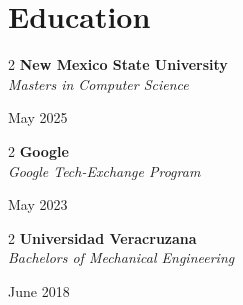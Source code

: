 \documentclass[10pt,letterpaper]{article}%
\newenvironment{twocolentry}[2][]{
    \onecolentry
    \def\secondColumn{#2}
    \setcolumnwidth{\fill, 4.5 cm}
    \begin{paracol}{2}
}{
    \switchcolumn \raggedleft \secondColumn
    \end{paracol}
    \endonecolentry
} %
\begin{document}
\section{Education} %
\label{section:Education}%
    \begin{twocolentry}{ %
        May 2025%
    } %
        \textbf{New Mexico State University} \\ %
        \textit{Masters in Computer Science}%
    \end{twocolentry} %
    \vspace{0.10 cm}%
    \begin{twocolentry}{ %
        May 2023%
    } %
        \textbf{Google} \\ %
        \textit{Google Tech-Exchange Program}%
    \end{twocolentry} %
    \vspace{0.10 cm}%
    \begin{twocolentry}{ %
        June 2018%
    } %
        \textbf{Universidad Veracruzana} \\ %
        \textit{Bachelors of Mechanical Engineering}%
    \end{twocolentry} %
    \vspace{0.10 cm}%
\end{document}
